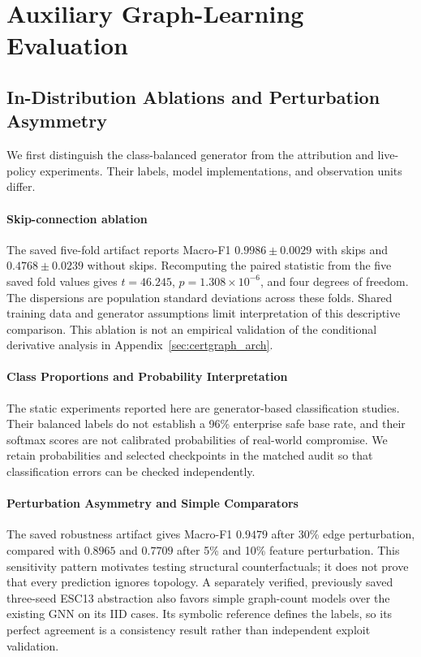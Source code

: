 \section{Auxiliary Graph-Learning Evaluation}
\label{sec:graph_evaluation}

\subsection{In-Distribution Ablations and Perturbation Asymmetry}
We first distinguish the class-balanced generator from the attribution and live-policy experiments. Their labels, model implementations, and observation units differ.

\paragraph{Skip-connection ablation}
The saved five-fold artifact reports Macro-F1 $0.9986 \pm 0.0029$ with skips and $0.4768 \pm 0.0239$ without skips. Recomputing the paired statistic from the five saved fold values gives $t=46.245$, $p=1.308\times10^{-6}$, and four degrees of freedom. The dispersions are population standard deviations across these folds. Shared training data and generator assumptions limit interpretation of this descriptive comparison. This ablation is not an empirical validation of the conditional derivative analysis in Appendix~\ref{sec:certgraph_arch}.

\paragraph{Class Proportions and Probability Interpretation}
The static experiments reported here are generator-based classification studies. Their balanced labels do not establish a 96\% enterprise safe base rate, and their softmax scores are not calibrated probabilities of real-world compromise. We retain probabilities and selected checkpoints in the matched audit so that classification errors can be checked independently.

\paragraph{Perturbation Asymmetry and Simple Comparators}
The saved robustness artifact gives Macro-F1 $0.9479$ after 30\% edge perturbation, compared with $0.8965$ and $0.7709$ after 5\% and 10\% feature perturbation. This sensitivity pattern motivates testing structural counterfactuals; it does not prove that every prediction ignores topology. A separately verified, previously saved three-seed ESC13 abstraction also favors simple graph-count models over the existing GNN on its IID cases. Its symbolic reference defines the labels, so its perfect agreement is a consistency result rather than independent exploit validation.

